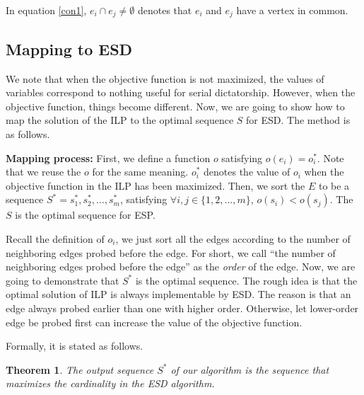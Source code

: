 \documentclass[letterpaper]{article}
\newtheorem{theorem}{Theorem}%
\begin{document}
In equation \ref{con1}, $e_i\cap e_j\neq \emptyset$ denotes that $e_i$ and $e_j$ have a vertex in common. 

\subsection{Mapping to ESD}
We note that when the objective function is not maximized, the values of variables correspond to nothing useful for serial dictatorship.
However, when the objective function, things become different.
Now, we are going to show how to map the solution of the ILP to the optimal sequence $S$ for ESD.
The method is as follows.

\textbf{Mapping process: }First, we define a function $o$ satisfying $o(e_i)=o_i^*$. 
Note that we reuse the $o$ for the same meaning.
$o_i^*$ denotes the value of $o_i$ when the objective function in the ILP has been maximized.
Then, we sort the $E$ to be a sequence $S^*=s_1^*,s_2^*,\ldots,s_m^*$, satisfying $\forall i,j\in\{1,2,\ldots,m\}$, $o(s_i)<o(s_j)$.
The $S$ is the optimal sequence for ESP.

Recall the definition of $o_i$, we just sort all the edges according to the number of neighboring edges probed before the edge.
For short, we call ``the number of neighboring edges probed before the edge'' as the \textit{order} of the edge.
Now, we are going to demonstrate that $S^*$ is the optimal sequence.
The rough idea is that the optimal solution of ILP is always implementable by ESD.
The reason is that an edge always probed earlier than one with higher order.
Otherwise, let lower-order edge be probed first can increase the value of the objective function.

Formally, it is stated as follows.

\begin{theorem}
	The output sequence $S^*$ of our algorithm is the sequence that maximizes the cardinality in the ESD algorithm.
\end{theorem}
\end{document}
